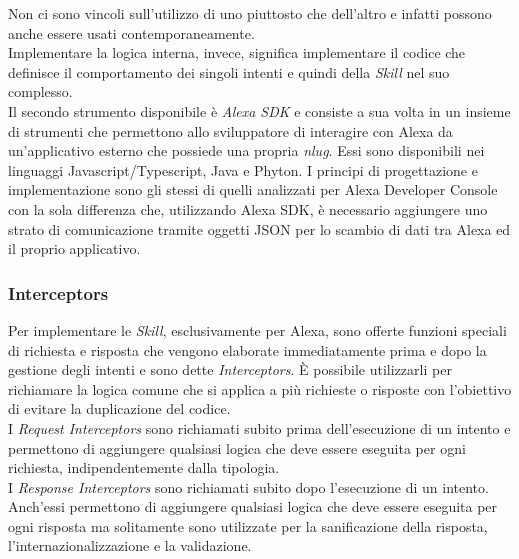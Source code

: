		Non ci sono vincoli sull'utilizzo di uno piuttosto che dell'altro e infatti possono anche essere usati contemporaneamente. \\
		Implementare la logica interna, invece, significa implementare il codice che definisce il comportamento dei singoli intenti e quindi della \emph{Skill} nel suo complesso. \\
		Il secondo strumento disponibile è \emph{Alexa SDK} e consiste a sua volta in un insieme di strumenti che permettono allo sviluppatore di interagire con Alexa da un'applicativo esterno che possiede una propria \emph{\gls{nlug}}. Essi sono disponibili nei linguaggi Javascript/Typescript, Java e Phyton. I principi di progettazione e implementazione sono gli stessi di quelli analizzati per Alexa Developer Console con la sola differenza che, utilizzando Alexa SDK, è necessario aggiungere uno strato di comunicazione tramite oggetti JSON per lo scambio di dati tra Alexa ed il proprio applicativo.
		\subsubsection{Interceptors}
		Per implementare le \emph{Skill}, esclusivamente per Alexa, sono offerte funzioni speciali di richiesta e risposta che vengono elaborate immediatamente prima e dopo la gestione degli intenti e sono dette \emph{Interceptors}. È possibile utilizzarli per richiamare la logica comune che si applica a più richieste o risposte con l'obiettivo di evitare la duplicazione del codice. \\		
		I \emph{Request Interceptors} sono richiamati subito prima dell'esecuzione di un intento e permettono di aggiungere qualsiasi logica che deve essere eseguita per ogni richiesta, indipendentemente dalla tipologia. \\		
		I \emph{Response Interceptors} sono richiamati subito dopo l'esecuzione di un intento. Anch'essi permettono di aggiungere qualsiasi logica che deve essere eseguita per ogni risposta ma solitamente sono utilizzate per la sanificazione della risposta, l'internazionalizzazione e la validazione. \\		
